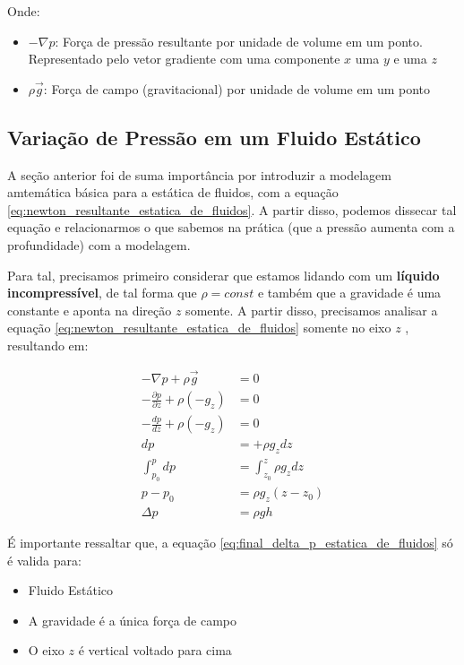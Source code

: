 \documentclass{article}
\newcommand{\n}{\nonumber \\ }
\begin{document}
Onde:
\begin{itemize}
    \item $-\nabla p$: Força de pressão resultante por unidade de volume em um ponto. Representado pelo vetor gradiente com uma componente $x$ uma $y$ e uma $z$
    \item $\rho \vec g$: Força de campo (gravitacional) por unidade de volume em um ponto
\end{itemize}

\subsection{Variação de Pressão em um Fluido Estático}
A seção anterior foi de suma importância por introduzir a modelagem amtemática básica para a estática de fluidos, com a equação \ref{eq:newton_resultante_estatica_de_fluidos}. A partir
disso, podemos dissecar tal equação e relacionarmos o que sabemos na prática (que a pressão aumenta com a profundidade) com a modelagem.

Para tal, precisamos primeiro considerar que estamos lidando com um \textbf{líquido incompressível}, de tal forma que $\rho=const$ e também que a gravidade é uma constante e aponta na
direção $z$ somente. A partir disso, precisamos analisar a equação \ref{eq:newton_resultante_estatica_de_fluidos} somente no eixo $z$ , resultando em:

\begin{align}
    -\nabla p + \rho \vec g                      & = 0 \n
    -\frac{\partial p}{\partial z} + \rho (-g_z) & = 0 \n
    -\frac{dp}{d z} + \rho (-g_z)                & = 0 \label{eq:diff_inicial_pressao}                      \\
    dp                                           & = +\rho g_z dz \n
    \int^p_{p_0} dp                              & = \int^z_{z_0} \rho g_z dz \n
    p - p_0                                      & = \rho g_z (z- z_0) \n
    \Delta p                                     & = \rho g h  \label{eq:final_delta_p_estatica_de_fluidos}
\end{align}

É importante ressaltar que, a equação \ref{eq:final_delta_p_estatica_de_fluidos} só é valida para:
\begin{itemize}
    \item Fluido Estático
    \item A gravidade é a única força de campo
    \item O eixo $z$ é vertical voltado para cima
\end{itemize}
\end{document}
